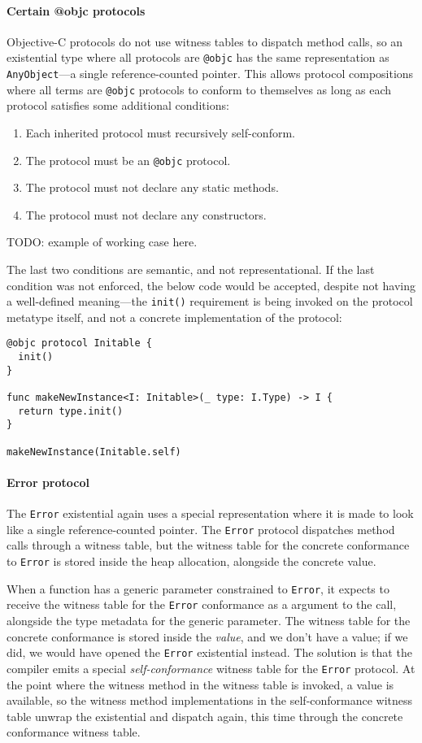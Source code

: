 \documentclass[a4paper,headsepline,bibliography=totoc,toc=flat,fleqn,twoside=semi]{scrbook}
\theoremstyle{definition}
\theoremstyle{definition}
\theoremstyle{definition}
\begin{document}
\paragraph{Certain @objc protocols} Objective-C protocols do not use witness tables to dispatch method calls, so an existential type where all protocols are \texttt{@objc} has the same representation as \texttt{AnyObject}---a single reference-counted pointer. This allows protocol compositions where all terms are \texttt{@objc} protocols to conform to themselves as long as each protocol satisfies some additional conditions:
\begin{enumerate}
\item Each inherited protocol must recursively self-conform.
\item The protocol must be an \texttt{@objc} protocol.
\item The protocol must not declare any static methods.
\item The protocol must not declare any constructors.
\end{enumerate}

TODO: example of working case here.

The last two conditions are semantic, and not representational. If the last condition was not enforced, the below code would be accepted, despite not having a well-defined meaning---the \texttt{init()} requirement is being invoked on the protocol metatype itself, and not a concrete implementation of the protocol:
\begin{Verbatim}
@objc protocol Initable {
  init()
}

func makeNewInstance<I: Initable>(_ type: I.Type) -> I {
  return type.init()
}

makeNewInstance(Initable.self)
\end{Verbatim}

\paragraph{Error protocol} The \texttt{Error} existential again uses a special representation where it is made to look like a single reference-counted pointer. The \texttt{Error} protocol dispatches method calls through a witness table, but the witness table for the concrete conformance to \texttt{Error} is stored inside the heap allocation, alongside the concrete value. 

When a function has a generic parameter constrained to \texttt{Error}, it expects to receive the witness table for the \texttt{Error} conformance as a argument to the call, alongside the type metadata for the generic parameter. The witness table for the concrete conformance is stored inside the \emph{value}, and we don't have a value; if we did, we would have opened the \texttt{Error} existential instead. The solution is that the compiler emits a special \emph{self-conformance} witness table for the \texttt{Error} protocol. At the point where the witness method in the witness table is invoked, a value is available, so the witness method implementations in the self-conformance witness table unwrap the existential and dispatch again, this time through the concrete conformance witness table.
\end{document}
